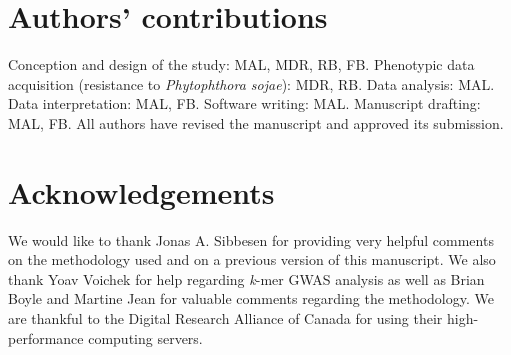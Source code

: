 \section*{Authors' contributions}
\label{sv-gwas-contributions}

Conception and design of the study: MAL, MDR, RB, FB.
Phenotypic data acquisition (resistance to \textit{Phytophthora sojae}): MDR, RB.
Data analysis: MAL.
Data interpretation: MAL, FB.
Software writing: MAL.
Manuscript drafting: MAL, FB.
All authors have revised the manuscript and approved its submission.

\section*{Acknowledgements}
\label{sv-gwas-acknowledgwments}

We would like to thank Jonas A. Sibbesen for providing very helpful comments
on the methodology used and on a previous version of this manuscript.
We also thank Yoav Voichek for help regarding \textit{k}-mer GWAS
analysis as well as Brian Boyle and Martine Jean for valuable comments
regarding the methodology. We are thankful to the Digital Research Alliance of
Canada for using their high-performance computing servers.




